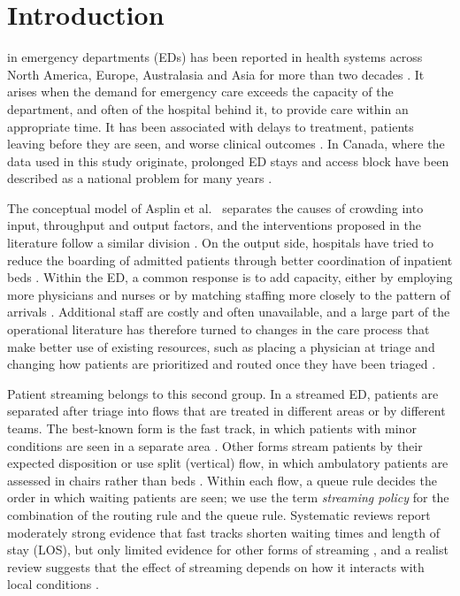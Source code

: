 \section{Introduction}
\label{sec:intro}

 in emergency departments (EDs) has been reported in health systems across North America, Europe, Australasia and Asia for more than two decades \cite{Pines2011_InternationalCrowding,hoot2008systematic}. It arises when the demand for emergency care exceeds the capacity of the department, and often of the hospital behind it, to provide care within an appropriate time. It has been associated with delays to treatment, patients leaving before they are seen, and worse clinical outcomes \cite{hoot2008systematic,Morley2018_EDCrowdingReview}. In Canada, where the data used in this study originate, prolonged ED stays and access block have been described as a national problem for many years \cite{Affleck2013_EDOvercrowdingCanada}.

The conceptual model of Asplin et al.\ \cite{Asplin2003EDCrowding} separates the causes of crowding into input, throughput and output factors, and the interventions proposed in the literature follow a similar division \cite{Morley2018_EDCrowdingReview}. On the output side, hospitals have tried to reduce the boarding of admitted patients through better coordination of inpatient beds \cite{LEE2021ProactiveCoordination_IJPE}. Within the ED, a common response is to add capacity, either by employing more physicians and nurses or by matching staffing more closely to the pattern of arrivals \cite{Optimization_of_Provider_Staffing2019,Simulation-based-optimization-of-staffing-levels_2015}. Additional staff are costly and often unavailable, and a large part of the operational literature has therefore turned to changes in the care process that make better use of existing resources, such as placing a physician at triage \cite{Provider_Triage_Management_Science_2019,peng2020evaluation} and changing how patients are prioritized and routed once they have been triaged \cite{boyle2012crowding}.

Patient streaming belongs to this second group. In a streamed ED, patients are separated after triage into flows that are treated in different areas or by different teams. The best-known form is the fast track, in which patients with minor conditions are seen in a separate area \cite{Oredsson2011_TriageFlowReview}. Other forms stream patients by their expected disposition \cite{Saghafian2012_Streaming_as_a_Mechanism,Kinsman2008} or use split (vertical) flow, in which ambulatory patients are assessed in chairs rather than beds \cite{Konrad2013_SplitFlowSim,feizi2023vertical}. Within each flow, a queue rule decides the order in which waiting patients are seen; we use the term \emph{streaming policy} for the combination of the routing rule and the queue rule. Systematic reviews report moderately strong evidence that fast tracks shorten waiting times and length of stay (LOS), but only limited evidence for other forms of streaming \cite{Oredsson2011_TriageFlowReview}, and a realist review suggests that the effect of streaming depends on how it interacts with local conditions \cite{StreaminINED}.


